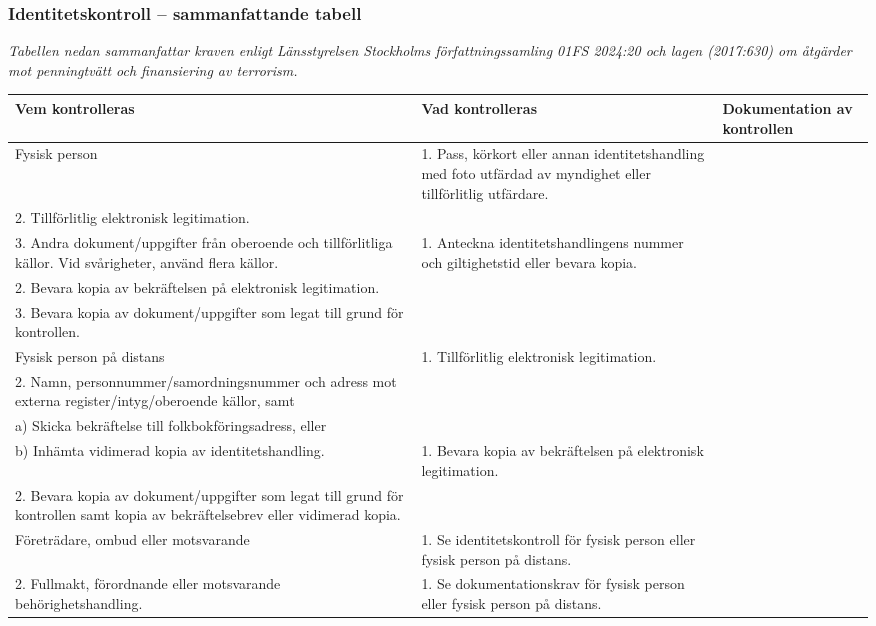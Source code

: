 \documentclass[10pt]{beamer}
\begin{document}
\begin{frame}[label=kontrolltabell]
  \frametitle{Identitetskontroll – sammanfattande tabell}
  \footnotesize
  \textit{Tabellen nedan sammanfattar kraven enligt Länsstyrelsen Stockholms författningssamling 01FS 2024:20 och lagen (2017:630) om åtgärder mot penningtvätt och finansiering av terrorism.}
  \vspace{0.3cm}
  \begin{tabular}{|p{2.8cm}|p{5.2cm}|p{5.2cm}|}
    \hline
    \textbf{Vem kontrolleras} & \textbf{Vad kontrolleras} & \textbf{Dokumentation av kontrollen} \\
    \hline
    Fysisk person & 
    1. Pass, körkort eller annan identitetshandling med foto utfärdad av myndighet eller tillförlitlig utfärdare.\\
    2. Tillförlitlig elektronisk legitimation.\\
    3. Andra dokument/uppgifter från oberoende och tillförlitliga källor. Vid svårigheter, använd flera källor. &
    1. Anteckna identitetshandlingens nummer och giltighetstid eller bevara kopia.\\
    2. Bevara kopia av bekräftelsen på elektronisk legitimation.\\
    3. Bevara kopia av dokument/uppgifter som legat till grund för kontrollen. \\
    \hline
    Fysisk person på distans &
    1. Tillförlitlig elektronisk legitimation.\\
    2. Namn, personnummer/samordningsnummer och adress mot externa register/intyg/oberoende källor, samt\\
    a) Skicka bekräftelse till folkbokföringsadress, eller\\
    b) Inhämta vidimerad kopia av identitetshandling. &
    1. Bevara kopia av bekräftelsen på elektronisk legitimation.\\
    2. Bevara kopia av dokument/uppgifter som legat till grund för kontrollen samt kopia av bekräftelsebrev eller vidimerad kopia. \\
    \hline
    Företrädare, ombud eller motsvarande &
    1. Se identitetskontroll för fysisk person eller fysisk person på distans.\\
    2. Fullmakt, förordnande eller motsvarande behörighetshandling. &
    1. Se dokumentationskrav för fysisk person eller fysisk person på distans.\\

\end{tabular}
\end{frame}
\end{document}

